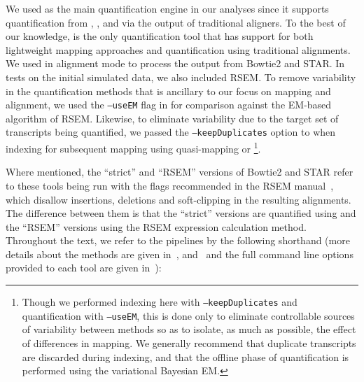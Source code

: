 We used \salmon as the main quantification engine in our analyses since it supports
quantification from \qm, \hsa, and via the output of traditional aligners. To
the best of our knowledge, \salmon is the only quantification tool
that has support for both lightweight mapping approaches and quantification
using traditional alignments. We used \salmon in alignment mode to process the
output from Bowtie2 and STAR. In tests on the initial simulated data, we also
included RSEM. To remove variability in the quantification methods that is
ancillary to our focus on mapping and alignment, we used the \texttt{--useEM}
flag in \salmon for comparison against the EM-based algorithm of RSEM. Likewise,
to eliminate variability due to the target set of transcripts being quantified,
we passed the \texttt{--keepDuplicates} option to \salmon when indexing for
subsequent mapping using quasi-mapping or \hsa\footnote{Though we performed
  indexing here with \texttt{--keepDuplicates} and quantification with
  \texttt{--useEM}, this is done only to eliminate controllable sources of
  variability between methods so as to isolate, as much as possible, the effect
  of differences in mapping. We generally recommend that duplicate transcripts
  are discarded during indexing, and that the offline phase of quantification is
  performed using the variational Bayesian EM.}.
  
Where mentioned, the ``strict'' and ``RSEM'' versions of Bowtie2 and STAR refer to these tools
being run with the flags recommended in the RSEM manual~\cite{rsem_manual},
which disallow insertions, deletions and soft-clipping in the resulting
alignments. The difference between them is that the ``strict'' versions are
quantified using \salmon and the ``RSEM'' versions using the RSEM expression
calculation method. Throughout the text, we refer to the pipelines by the
following shorthand (more details about the methods are given in~, and~ and
the full command line options provided to
each tool are given in~):

